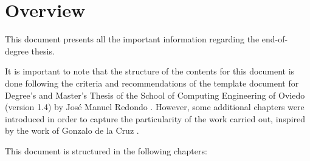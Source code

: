 \renewcommand{\documentname}{Overview}

\chapter{Overview}

This document presents all the important information regarding the \textit{\tfg} end-of-degree thesis.

It is important to note that the structure of the contents for this document is done following the criteria and recommendations of the template document for Degree's and Master's Thesis of the School of Computing Engineering of Oviedo (version 1.4) by José Manuel Redondo \cite{redondotemplate}. However, some additional chapters were introduced in order to capture the particularity of the work carried out, inspired by the work of Gonzalo de la Cruz \cite{delacruz18metaheuristics}.

This document is structured in the following chapters:

